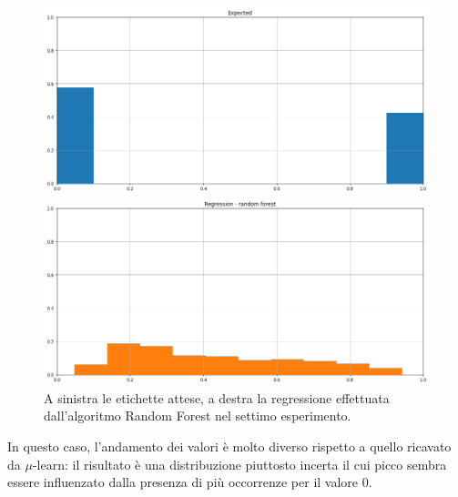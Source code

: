 \documentclass[12pt]{report}
\theoremstyle{definition}
\begin{document}
\begin{figure}
\centering
    \begin{minipage}{0.48\textwidth}
        \includegraphics[width=\linewidth]{images/experiment_kaggle/expected_classification.png}
    \end{minipage}
    \begin{minipage}{0.48\textwidth}
        \includegraphics[width=\linewidth]{images/experiment_kaggle/prediction_regression_rf.png}
    \end{minipage}
    \caption{A sinistra le etichette attese, a destra la regressione effettuata dall'algoritmo Random Forest nel settimo esperimento.}
    \label{rf_exp7}
\end{figure} 
In questo caso, l'andamento dei valori è molto diverso rispetto a quello ricavato da $\mu$-learn: il risultato è una distribuzione piuttosto incerta il cui picco sembra essere influenzato dalla presenza di più occorrenze per il valore 0.
\end{document}
